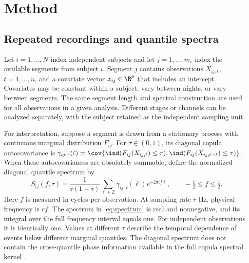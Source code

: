 \section{Method}\label{sec:method}
\subsection{Repeated recordings and quantile spectra}
Let $i=1,\ldots,N$ index independent subjects and let $j=1,\ldots,m_i$ index the available segments from subject $i$. Segment $j$ contains observations $X_{ij,t}$, $t=1,\ldots,n$, and a covariate vector $x_{ij}\in\R^p$ that includes an intercept. Covariates may be constant within a subject, vary between nights, or vary between segments. The same segment length and spectral construction are used for all observations in a given analysis. Different stages or channels can be analyzed separately, with the subject retained as the independent sampling unit.

For interpretation, suppose a segment is drawn from a stationary process with continuous marginal distribution $F_{ij}$. For $\tau\in(0,1)$, its diagonal copula autocovariance is $\gamma_{ij,\tau}(\ell)=\cov\{\ind(F_{ij}(X_{ij,t})\leq\tau),\ind(F_{ij}(X_{ij,t-\ell})\leq\tau)\}$. When these autocovariances are absolutely summable, define the normalized diagonal quantile spectrum by
\begin{equation}\label{eq:spectrum}
 S_{ij}(f,\tau)
 =\frac{1}{\tau(1-\tau)}\sum_{\ell\in\mathbb Z}
 \gamma_{ij,\tau}(\ell)e^{-2\pi\mathrm{i}f\ell},
 \qquad -\tfrac12\leq f\leq\tfrac12.
\end{equation}
Here $f$ is measured in cycles per observation. At sampling rate $r$ Hz, physical frequency is $rf$. The spectrum in \eqref{eq:spectrum} is real and nonnegative, and its integral over the full frequency interval equals one. For independent observations it is identically one. Values at different $\tau$ describe the temporal dependence of events below different marginal quantiles. The diagonal spectrum does not contain the cross-quantile phase information available in the full copula spectral kernel \citep{Dette2015,Kley2016}.

